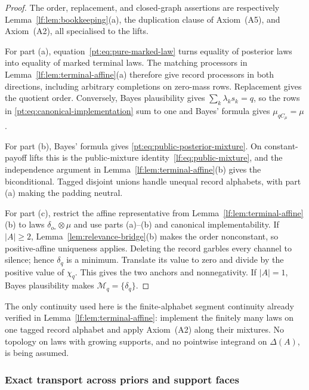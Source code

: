 \documentclass[11pt,a4paper]{article}
\theoremstyle{definition}
\newcommand{\1}{\mathbf 1}
\begin{document}
\begin{proof}
The order, replacement, and closed-graph assertions are respectively
Lemma~\ref{lf:lem:bookkeeping}\textup{(a)}, the duplication clause of
Axiom~\textup{(A5)}, and Axiom~\textup{(A2)}, all specialised to the lifts.

For part \textup{(a)}, equation~\eqref{pt:eq:pure-marked-law} turns equality
of posterior laws into equality of marked terminal laws.  The matching
processors in Lemma~\ref{lf:lem:terminal-affine}\textup{(a)} therefore give
record processors in both directions, including arbitrary completions on
zero-mass rows.  Replacement gives the quotient order.  Conversely, Bayes
plausibility gives $\sum_k\lambda_ks_k=q$, so the rows in
\eqref{pt:eq:canonical-implementation} sum to one and Bayes' formula gives
$\mu_{qC_\mu}=\mu$.

For part \textup{(b)}, Bayes' formula gives
\eqref{pt:eq:public-posterior-mixture}.  On constant-payoff lifts this is the
public-mixture identity~\eqref{lf:eq:public-mixture}, and the independence
argument in Lemma~\ref{lf:lem:terminal-affine}\textup{(b)} gives the
biconditional.  Tagged disjoint unions handle unequal record alphabets, with
part \textup{(a)} making the padding neutral.

For part \textup{(c)}, restrict the affine representative from
Lemma~\ref{lf:lem:terminal-affine}\textup{(b)} to laws
$\delta_{o_\ast}\otimes\mu$ and use parts \textup{(a)--(b)} and canonical
implementability.  If $|A|\ge2$, Lemma~\ref{lem:relevance-bridge}\textup{(b)}
makes the order nonconstant, so positive-affine uniqueness applies.  Deleting
the record garbles every channel to silence; hence $\delta_q$ is a minimum.
Translate its value to zero and divide by the positive value of $\chi_q$.
This gives the two anchors and nonnegativity.  If $|A|=1$, Bayes plausibility
makes $\mathcal M_q=\{\delta_q\}$.
\end{proof}

The only continuity used here is the finite-alphabet segment continuity
already verified in Lemma~\ref{lf:lem:terminal-affine}: implement the finitely
many laws on one tagged record alphabet and apply Axiom~\textup{(A2)} along
their mixtures.  No topology on laws with growing supports, and no pointwise
integrand on $\Delta(A)$, is being assumed.

\subsubsection{Exact transport across priors and support faces}
\end{document}
